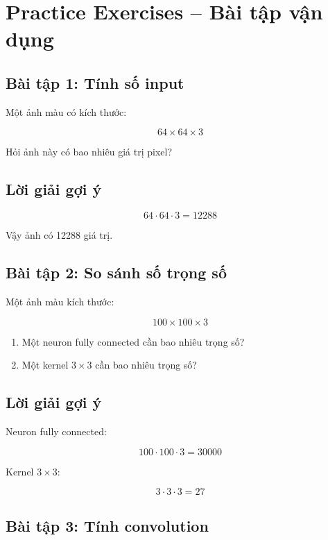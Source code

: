 \section{Practice Exercises -- Bài tập vận dụng}

\subsection*{Bài tập 1: Tính số input}

Một ảnh màu có kích thước:

\[
    64\times64\times3
\]

Hỏi ảnh này có bao nhiêu giá trị pixel?

\subsection*{Lời giải gợi ý}

\[
    64\cdot64\cdot3=12288
\]

Vậy ảnh có 12288 giá trị.

\subsection*{Bài tập 2: So sánh số trọng số}

Một ảnh màu kích thước:

\[
    100\times100\times3
\]

\begin{enumerate}
    \item Một neuron fully connected cần bao nhiêu trọng số?
    \item Một kernel $3\times3$ cần bao nhiêu trọng số?
\end{enumerate}

\subsection*{Lời giải gợi ý}

Neuron fully connected:

\[
    100\cdot100\cdot3=30000
\]

Kernel $3\times3$:

\[
    3\cdot3\cdot3=27
\]

\subsection*{Bài tập 3: Tính convolution}

